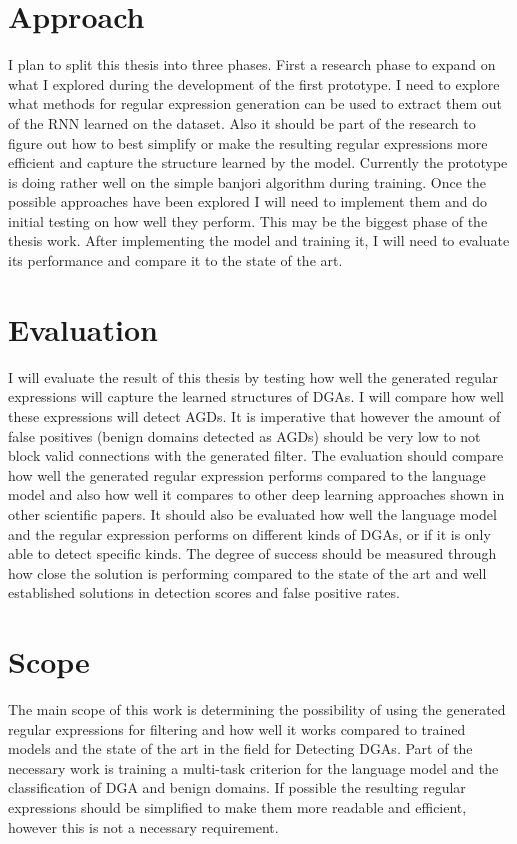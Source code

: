 \documentclass[a4paper, 12pt]{article}
\begin{document}
\section{Approach}
I plan to split this thesis into three phases. First a research phase to expand on what I explored
during the development of the first prototype. I need to explore what methods for regular expression
generation can be used to extract them out of the RNN learned on the dataset. Also it should be part
of the research to figure out how to best simplify or make the resulting regular expressions more
efficient and capture the structure learned by the model. Currently the prototype is doing rather
well on the simple banjori algorithm during training. Once the possible approaches have been
explored I will need to implement them and do initial testing on how well they perform.  This may be
the biggest phase of the thesis work. After implementing the model and training it, I will need to
evaluate its performance and compare it to the state of the art.

\section{Evaluation}
I will evaluate the result of this thesis by testing how well the generated regular expressions
will capture the learned structures of DGAs. I will compare how well these expressions will detect
AGDs. It is imperative that however the amount of false positives (benign domains detected as AGDs)
should be very low to not block valid connections with the generated filter.
The evaluation should compare how well the generated regular expression performs compared to the
language model and also how well it compares to other deep learning approaches shown in other
scientific papers. It should also be evaluated how well the language model and the regular
expression performs on different kinds of DGAs, or if it is only able to detect specific kinds. 
The degree of success should be measured through how close the solution is performing compared to
the state of the art \cite{yu_character_2018} and well established solutions in detection scores and false positive rates.

\section{Scope}
The main scope of this work is determining the possibility of using the generated regular
expressions for
filtering and how well it works compared to trained models and the state of the art in the field for
Detecting DGAs. Part of the necessary work is training a multi-task criterion for the language model
and the classification of DGA and benign domains. If possible the resulting regular expressions
should be simplified to make them more readable and efficient, however this is not a necessary
requirement.
\end{document}
